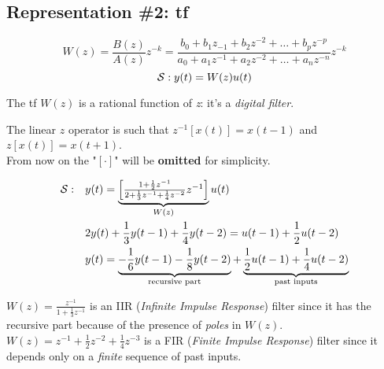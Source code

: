 
\subsection{Representation \#2: \acrfull{tf}}

\[
    W(z) = \frac{B(z)}{A(z)} z^{-k} = \frac{b_0 + b_1z_{-1} + b_2z^{-2} + \ldots + b_pz^{-p}}{a_0 + a_1z^{-1} + a_2z^{-2} + \ldots + a_nz^{-n}} z^{-k} 
\]
\vspace{1pt}
\[
     \mathcal{S}: y(t) = W(z)u(t)
\]     

The \gls{tf} $W(z)$ is a rational function of \emph{z}: it's a \emph{digital filter}.\\

\begin{recall}[$z$ operator]
    The linear $z$ operator is such that $z^{-1}[x(t)]=x(t-1)$ and $z[x(t)]=x(t+1)$.\\
    From now on the "$[\cdot]$" will be \textbf{omitted} for simplicity.
\end{recall}


\begin{example}
    \begin{align*}
    \mathcal{S}: \quad
        & y(t) = \underbrace{\begin{bmatrix}
            \frac{1+\frac{1}{2}z^{-1}}{2+\frac{1}{3}z^{-1}+\frac{1}{4}z^{-2}} z^{-1}
        \end{bmatrix}}_{W(z)} u(t) \\
        & 2y(t) + \frac{1}{3}y(t-1) + \frac{1}{4}y(t-2) = u(t-1) + \frac{1}{2}u(t-2) \\
        & y(t) = \underbrace{-\frac{1}{6}y(t-1) - \frac{1}{8}y(t-2)}_\text{recursive part} + \underbrace{\frac{1}{2}u(t-1) + \frac{1}{4}u(t-2)}_\text{past inputs}
    \end{align*}

\end{example}
\begin{remark}
\hfill \break 
    $\displaystyle W(z) = \frac{z^{-1}}{1 + \frac{1}{3}z^{-1}}$ is an IIR (\emph{Infinite Impulse Response}) filter since it has the recursive part because of the presence of \emph{poles} in $W(z)$.\\
    $\displaystyle W(z) = z^{-1} + \frac{1}{2}z^{-2} + \frac{1}{4}z^{-3}$ is a FIR (\emph{Finite Impulse Response}) filter since it depends only on a \emph{finite} sequence of past inputs.
\end{remark}

